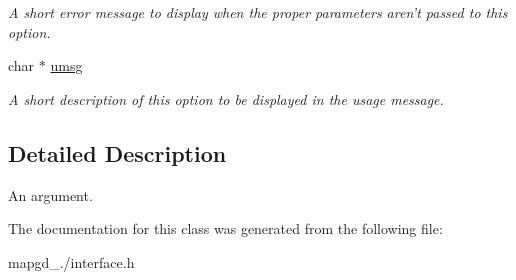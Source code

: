 \begin{DoxyCompactItemize}
\begin{DoxyCompactList}\small\item\em A short error message to display when the proper parameters aren't passed to this option. \end{DoxyCompactList}\item 
\hypertarget{classarg__t_a1e3b887bbd417a0339ec430878f3feac}{char $\ast$ \hyperlink{classarg__t_a1e3b887bbd417a0339ec430878f3feac}{umsg}}\label{classarg__t_a1e3b887bbd417a0339ec430878f3feac}

\begin{DoxyCompactList}\small\item\em A short description of this option to be displayed in the usage message. \end{DoxyCompactList}\end{DoxyCompactItemize}


\subsection{Detailed Description}
An argument. 

The documentation for this class was generated from the following file\-:\begin{DoxyCompactItemize}
\item 
mapgd\-\_./interface.\-h\end{DoxyCompactItemize}
